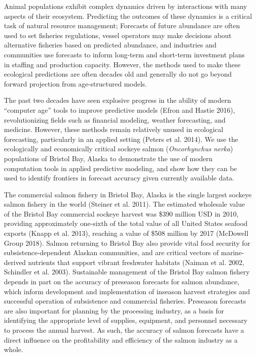\documentclass[
]{article}
\begin{document}
Animal populations exhibit complex dynamics driven by interactions with many aspects of their ecosystem. Predicting the outcomes of these dynamics is a critical task of natural resource management; Forecasts of future abundance are often used to set fisheries regulations, vessel operators may make decisions about alternative fisheries based on predicted abundance, and industries and communities use forecasts to inform long-term and short-term investment plans in staffing and production capacity. However, the methods used to make these ecological predictions are often decades old and generally do not go beyond forward projection from age-structured models.

The past two decades have seen explosive progress in the ability of modern ``computer age'' tools to improve predictive models (Efron and Hastie 2016), revolutionizing fields such as financial modeling, weather forecasting, and medicine. However, these methods remain relatively unused in ecological forecasting, particularly in an applied setting (Peters et al. 2014). We use the ecologically and economically critical sockeye salmon (\emph{Oncorhynchus nerka}) populations of Bristol Bay, Alaska to demonstrate the use of modern computation tools in applied predictive modeling, and show how they can be used to identify frontiers in forecast accuracy given currently available data.

The commercial salmon fishery in Bristol Bay, Alaska is the single largest sockeye salmon fishery in the world (Steiner et al. 2011). The estimated wholesale value of the Bristol Bay commercial sockeye harvest was \$390 million USD in 2010, providing approximately one-sixth of the total value of all United States seafood exports (Knapp et al. 2013), reaching a value of \$508 million by 2017 (McDowell Group 2018). Salmon returning to Bristol Bay also provide vital food security for subsistence-dependent Alaskan communities, and are critical vectors of marine-derived nutrients that support vibrant freshwater habitats (Naiman et al. 2002, Schindler et al. 2003). Sustainable management of the Bristol Bay salmon fishery depends in part on the accuracy of preseason forecasts for salmon abundance, which inform development and implementation of inseason harvest strategies and successful operation of subsistence and commercial fisheries. Preseason forecasts are also important for planning by the processing industry, as a basis for identifying the appropriate level of supplies, equipment, and personnel necessary to process the annual harvest. As such, the accuracy of salmon forecasts have a direct influence on the profitability and efficiency of the salmon industry as a whole.
\end{document}
